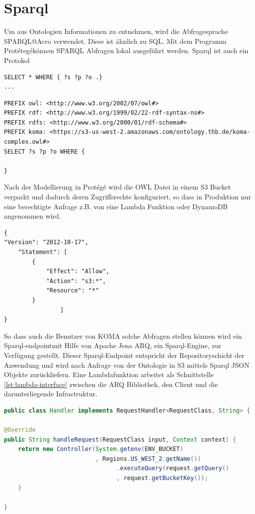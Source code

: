 \documentclass[
12pt,
english,
ngerman,
headsepline,
twoside,
openright,
numbers=noenddot,version=first
]{scrreprt}
\begin{document}
\section{Sparql}

Um aus Ontologien Informationen zu entnehmen, wird die Abfragesprache \glqq SPARQL\grqq @Acro verwendet. 
Diese ist ähnlich zu SQL. Mit dem Programm \glqq Protétegé\grqq können SPARQL Abfragen lokal ausgeführt werden.
Sparql ist auch ein Protokol

\begin{lstlisting}[language=Sparql]
SELECT * WHERE { ?s ?p ?o .}
...
\end{lstlisting}

\begin{lstlisting}
PREFIX owl: <http://www.w3.org/2002/07/owl#>
PREFIX rdf: <http://www.w3.org/1999/02/22-rdf-syntax-ns#>
PREFIX rdfs: <http://www.w3.org/2000/01/rdf-schema#>
PREFIX koma: <https://s3-us-west-2.amazonaws.com/ontology.thb.de/koma-complex.owl#>
SELECT ?s ?p ?o WHERE {

}
\end{lstlisting}

Nach der Modellierung in Protégé wird die OWL Datei in einem S3 Bucket verpackt und dadurch deren Zugriffsrechte konfiguriert, so dass in Produktion nur eine berechtigte Anfrage z.B. von eine Lambda Funktion oder DynamoDB angenommen wird. 

\begin{lstlisting}
{
"Version": "2012-10-17",
	"Statement": [
		{
			"Effect": "Allow",
			"Action": "s3:*",
			"Resource": "*"
		}
				]
}
\end{lstlisting}

So dass auch die Benutzer von KOMA solche Abfragen stellen können wird ein \glqq Sparql-endpoint\grqq mit Hilfe von Apache Jena ARQ, ein Sparql-Engine, zur Verfügung gestellt. 
Dieser Sparql-Endpoint entspricht der Repositoryschicht der Anwendung und wird nach Anfrage von der Ontologie in S3 mittels Sparql JSON Objekte zurückliefern.
Eine Lambdafunktion arbeitet als Schnittstelle \ref{lst:lambda-interface} zwischen die ARQ Bibliothek, den Client und die darunterliegende Infrastruktur.

\begin{lstlisting}[language=Java,caption={Schnittstele Lambda},label={lst:lambda-interface}]
public class Handler implements RequestHandler<RequestClass, String> {

@Override
public String handleRequest(RequestClass input, Context context) {
	return new Controller(System.getenv(ENV_BUCKET)
						  , Regions.US_WEST_2.getName())
								.executeQuery(request.getQuery()
								, request.getBucketKey());
	}

}

\end{lstlisting}
\end{document}

